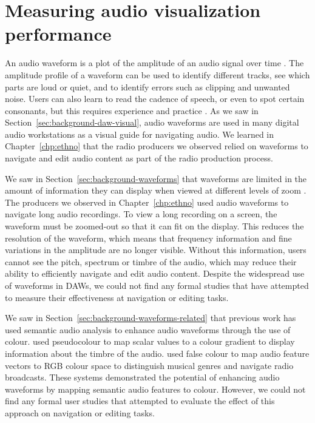 \chapter{Measuring audio visualization performance}\label{chp:colourised}


An audio waveform is a plot of the amplitude of an audio signal over time \citep[p.~92]{Hausman2012}.  The amplitude
profile of a waveform can be used to identify different tracks, see which parts are loud or quiet, and to identify
errors such as clipping and unwanted noise.  Users can also learn to read the cadence of speech, or even to spot
certain consonants, but this requires experience and practice \citep[p.~115]{Hausman2012}.  As we saw in
Section~\ref{sec:background-daw-visual}, audio waveforms are used in many digital audio workstations as a visual guide
for navigating audio. We learned in Chapter~\ref{chp:ethno} that the radio producers we observed relied on
waveforms to navigate and edit audio content as part of the radio production process.

We saw in Section~\ref{sec:background-waveforms} that waveforms are limited in the amount of information they can
display when viewed at different levels of zoom \citep{Loviscach2011}.  The producers we observed in
Chapter~\ref{chp:ethno} used audio waveforms to navigate long audio recordings. To view a long recording on a screen,
the waveform must be zoomed-out so that it can fit on the display.  This reduces the resolution of the waveform, which
means that frequency information and fine variations in the amplitude are no longer visible.  Without this information,
users cannot see the pitch, spectrum or timbre of the audio, which may reduce their ability to efficiently navigate and
edit audio content.  Despite the widespread use of waveforms in DAWs, we could not find any formal studies that have
attempted to measure their effectiveness at navigation or editing tasks.

We saw in Section~\ref{sec:background-waveforms-related} that previous work has used semantic audio analysis to enhance
audio waveforms through the use of colour.  \citet{Rice2005,Akkermans2011,Loviscach2011a} used pseudocolour to map
scalar values to a colour gradient to display information about the timbre of the audio.
\citet{Tzanetakis2000,Mason2007} used false colour to map audio feature vectors to RGB colour space to distinguish
musical genres and navigate radio broadcasts.  These systems demonstrated the potential of enhancing audio waveforms by
mapping semantic audio features to colour. However, we could not find any formal user studies that attempted to
evaluate the effect of this approach on navigation or editing tasks.

